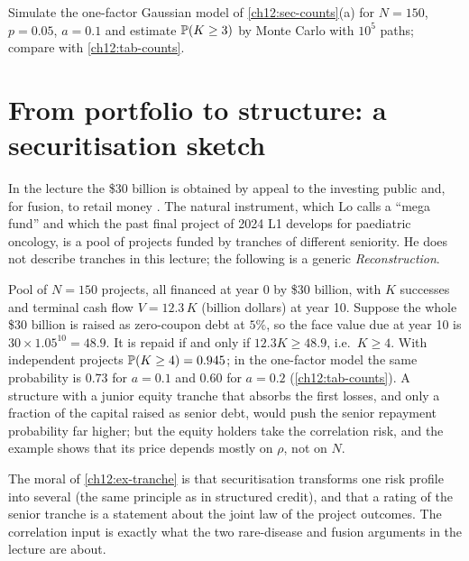 \begin{paracol}{2}
\begin{exercise}
Simulate the one-factor Gaussian model of \cref{ch12:sec-counts}(a) for $N=150$, $p=0.05$, $a=0.1$ and estimate
$\mathbb{P}(K\ge3)$ by Monte Carlo with $10^5$ paths; compare with \cref{ch12:tab-counts}.
\end{exercise}

\section{From portfolio to structure: a securitisation sketch}\label{ch12:sec-tranche}

In the lecture the \$30 billion is obtained by appeal to the investing public  and, for fusion, to
retail money . The natural instrument, which Lo calls a ``mega fund''  and
which the past final project of 2024 L1 develops for paediatric oncology, is a pool of projects funded by
tranches of different seniority. He does not describe tranches in this lecture; the following is a generic
\emph{Reconstruction}.

\begin{example}\label{ch12:ex-tranche}
Pool of $N=150$ projects, all financed at year 0 by \$30 billion, with $K$ successes and terminal cash flow
$V=12.3\,K$ (billion dollars) at year 10. Suppose the whole \$30 billion is raised as zero-coupon debt at $5\%$,
so the face value due at year 10 is $30\times1.05^{10}=48.9$. It is repaid if and only if
$12.3K\ge48.9$, i.e.\ $K\ge4$. With independent projects $\mathbb{P}(K\ge4)=0.945$; in the one-factor model the same probability is
$0.73$ for $a=0.1$ and $0.60$ for $a=0.2$ (\cref{ch12:tab-counts}). A structure with a junior equity tranche that
absorbs the first losses, and only a fraction of the capital raised as senior debt, would push the
senior repayment probability far higher; but the equity holders take the correlation risk, and the
example shows that its price depends mostly on $\rho$, not on $N$.
\end{example}
The moral of \cref{ch12:ex-tranche} is that securitisation transforms one risk profile into several
(the same principle as in structured credit), and that a rating of the senior tranche is a statement about the joint
law of the project outcomes. The correlation input is exactly what the two rare-disease and fusion arguments in the
lecture are about.


\end{paracol}
